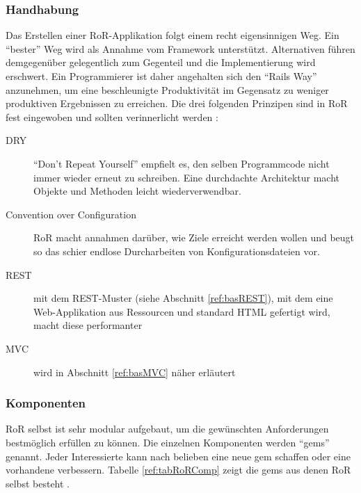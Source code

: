 \subsubsection{Handhabung}
Das Erstellen einer RoR-Applikation folgt einem recht eigensinnigen Weg. Ein
"`bester"' Weg wird als Annahme vom Framework unterstützt. Alternativen führen
demgegenüber gelegentlich zum Gegenteil und die Implementierung wird erschwert.
Ein Programmierer ist daher angehalten sich den "`Rails Way"' anzunehmen, um
eine beschleunigte Produktivität im Gegensatz zu weniger produktiven
Ergebnissen zu erreichen. Die drei folgenden Prinzipen sind in RoR fest
eingewoben und sollten verinnerlicht werden \cite{railsGuides:2013}:
\begin{description}
\item[DRY] "`Don't Repeat Yourself"' empfielt es, den selben Programmcode nicht
immer wieder erneut zu schreiben. Eine durchdachte Architektur macht Objekte und
Methoden leicht wiederverwendbar.
\item[Convention over Configuration] RoR macht annahmen darüber, wie Ziele
erreicht werden wollen und beugt so das schier endlose Durcharbeiten von
Konfigurationsdateien vor.
\item[REST] mit dem \ac{REST}-Muster (siehe Abschnitt \ref{ref:basREST}), mit
dem eine Web-Applikation aus Ressourcen und standard HTML gefertigt wird, macht diese performanter
\item[MVC] wird in Abschnitt \ref{ref:basMVC} näher erläutert
\end{description}

\subsubsection{Komponenten}\label{ref:baseGem}
RoR selbst ist sehr modular aufgebaut, um die gewünschten Anforderungen
bestmöglich erfüllen zu können. Die einzelnen Komponenten werden "`gems"'
genannt. Jeder Interessierte kann nach belieben eine neue gem schaffen oder eine
vorhandene verbessern. Tabelle \ref{ref:tabRoRComp} zeigt die gems aus denen RoR
selbst besteht \cite{railsGuides:2013}.

